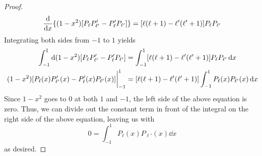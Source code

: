 \documentclass[../finalProject.tex]{subfiles}
\begin{document}
\begin{itemize}
\begin{proof}
        \begin{equation*}
            \dv{x}\{(1-x^2)[P_\ell P_{\ell'}'-P_\ell'P_{\ell'}]\} = [\ell(\ell+1)-\ell'(\ell'+1)]P_\ell P_{\ell'}
        \end{equation*}
        Integrating both sides from $-1$ to $1$ yields
        \begin{align*}
            \int_{-1}^1\dd{(1-x^2)[P_\ell P_{\ell'}'-P_\ell'P_{\ell'}]} &= \int_{-1}^1[\ell(\ell+1)-\ell'(\ell'+1)]P_\ell P_{\ell'}\dd{x}\\
            \eval{(1-x^2)[P_\ell(x)P_{\ell'}'(x)-P_\ell'(x)P_{\ell'}(x)]}_{-1}^1 &= [\ell(\ell+1)-\ell'(\ell'+1)]\int_{-1}^1P_\ell(x)P_{\ell'}(x)\dd{x}
        \end{align*}
        Since $1-x^2$ goes to 0 at both $1$ and $-1$, the left side of the above equation is zero. Thus, we can divide out the constant term in front of the integral on the right side of the above equation, leaving us with
        \begin{equation*}
            0 = \int_{-1}^1P_\ell(x)P_{\ell'}(x)\dd{x}
        \end{equation*}
        as desired.
    \end{proof}
\end{itemize}
\end{document}
